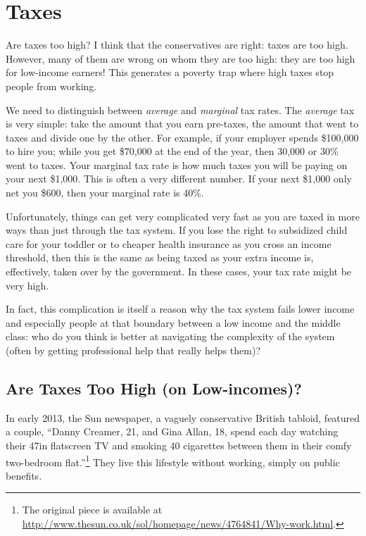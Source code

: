 \chapter{Taxes}%
\label{chpt:taxes}

Are taxes too high? I think that the conservatives are right: taxes are too
high. However, many of them are wrong on whom they are too high: they are
too high for low-income earners! This generates a poverty trap where high taxes
stop people from working.

We need to distinguish between \emph{average} and \emph{marginal} tax rates.
The \emph{average} tax is very simple: take the amount that you earn pre-taxes,
the amount that went to taxes and divide one by the other. For example, if your
employer spends \$100,000 to hire you; while you get \$70,000 at the end of the
year, then 30,000 or 30\% went to taxes. Your marginal tax rate is how much
taxes you will be paying on your next \$1,000. This is often a very different
number. If your next \$1,000 only net you \$600, then your marginal rate is
40\%. %

Unfortunately, things can get very complicated very fast as you are taxed in
more ways than just through the tax system. If you lose the right to subsidized
child care for your toddler or to cheaper health insurance as you cross an
income threshold, then this is the same as being taxed as your extra income is,
effectively, taken over by the government. In these cases, your tax rate might
be very high.


In fact, this complication is itself a reason why the tax system fails lower
income and especially people at that boundary between a low income and the
middle class: who do you think is better at navigating the complexity of the
system (often by getting professional help that really helps them)?

\section{Are Taxes Too High (on Low-incomes)?}

In early 2013, the Sun newspaper, a vaguely conservative British tabloid,
featured a couple, ``Danny Creamer, 21, and Gina Allan, 18, spend each day
watching their 47in flatscreen TV and smoking 40 cigarettes between them in
their comfy two-bedroom flat.''\footnote{The original piece is available at
\url{http://www.thesun.co.uk/sol/homepage/news/4764841/Why-work.html}.} They
live this lifestyle without working, simply on public benefits.

